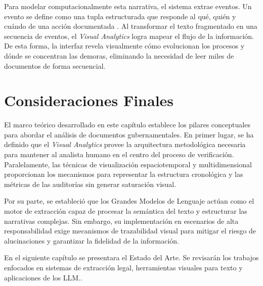 Para modelar computacionalmente esta narrativa, el sistema extrae eventos. Un evento se define como una tupla estructurada que responde al qué, quién y cuándo de una acción documentada \cite{navas2022whenthefact, yao2022leven}. Al transformar el texto fragmentado en una secuencia de eventos, el \textit{Visual Analytics} logra mapear el flujo de la información. De esta forma, la interfaz revela visualmente cómo evolucionan los procesos y dónde se concentran las demoras, eliminando la necesidad de leer miles de documentos de forma secuencial.


\section{Consideraciones Finales}
El marco teórico desarrollado en este capítulo establece los pilares conceptuales para abordar el análisis de documentos gubernamentales. En primer lugar, se ha definido que el \textit{Visual Analytics} provee la arquitectura metodológica necesaria para mantener al analista humano en el centro del proceso de verificación. Paralelamente, las técnicas de visualización espaciotemporal y multidimensional proporcionan los mecanismos para representar la estructura cronológica y las métricas de las auditorías sin generar saturación visual.

Por su parte, se estableció que los Grandes Modelos de Lenguaje actúan como el motor de extracción capaz de procesar la semántica del texto y estructurar las narrativas complejas. Sin embargo, su implementación en escenarios de alta responsabilidad exige mecanismos de trazabilidad visual para mitigar el riesgo de alucinaciones y garantizar la fidelidad de la información.

En el siguiente capítulo se presentara el Estado del Arte. Se revisarán los trabajos enfocados en sistemas de extracción legal, herramientas visuales para texto y aplicaciones de los \acs{LLM}..
